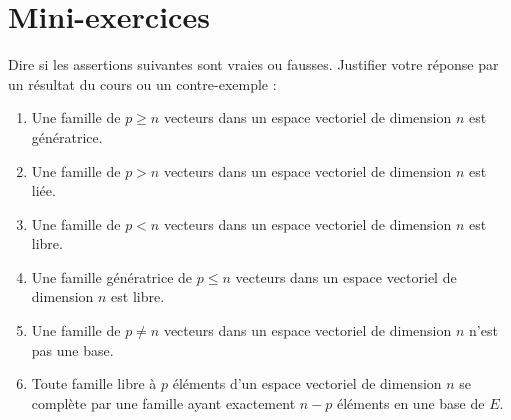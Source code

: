 %
%
%
%
%
%



\section{Mini-exercices}

\begin{frame}
\begin{miniexercice}
Dire si les assertions suivantes sont vraies ou fausses.
Justifier votre réponse par un résultat du cours ou un contre-exemple :
\begin{enumerate}
  \item Une famille de $p \ge n$ vecteurs dans un espace vectoriel 
  de dimension $n$ est génératrice.
  
  \item Une famille de $p > n$ vecteurs dans un espace vectoriel 
  de dimension $n$ est liée.  
  
  \item Une famille de $p < n$ vecteurs dans un espace vectoriel 
  de dimension $n$ est libre.   
  
  \item Une famille génératrice de $p \le n$ vecteurs dans un espace vectoriel 
  de dimension $n$ est libre.
   
  \item Une famille de $p \neq n$ vecteurs dans un espace vectoriel 
  de dimension $n$ n'est pas une base.
  
  \item Toute famille libre à $p$ éléments d'un espace vectoriel de dimension $n$
  se complète par une famille ayant exactement $n-p$ éléments en une base de $E$.
\end{enumerate}
\end{miniexercice}
\end{frame}

